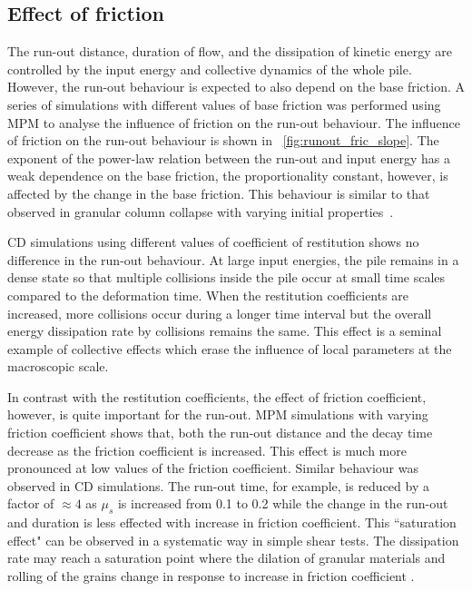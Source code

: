 \subsection{Effect of friction}
\label{sec:parameters}

The run-out distance, duration of flow, and the dissipation of kinetic energy 
are controlled by the input energy and collective dynamics of the whole pile. 
However, the run-out behaviour is expected to also depend on the base friction. 
A series of simulations with different values of base friction was performed 
using MPM to analyse the influence of friction on the run-out behaviour. The 
influence of friction on the run-out behaviour is shown in
~\cref{fig:runout_fric_slope}. The exponent of the 
power-law relation between the run-out and input energy has a weak dependence 
on the base friction, the proportionality constant, however, is affected by the 
change in the base friction. This behaviour is similar to that observed in 
granular column collapse with varying initial 
properties~\citep{Balmforth2005,Lajeunesse2005}. 

CD simulations using different values of coefficient of restitution shows no 
difference in the run-out behaviour. At large input energies, the pile remains 
in a dense state so that multiple collisions inside the pile occur at small 
time scales compared to the deformation time. When the restitution coefficients 
are increased, more collisions occur during a longer time interval but the 
overall energy dissipation rate by collisions remains the same. This effect is 
a seminal example of collective effects which erase the influence of local 
parameters at the macroscopic scale.

In contrast with the restitution coefficients, the effect of friction 
coefficient, however, is quite important for the run-out. MPM simulations with 
varying friction coefficient shows that, both the run-out distance and the 
decay time decrease as the friction coefficient is increased. This 
effect is much more pronounced at low values of the friction coefficient. 
Similar behaviour was observed in CD simulations. The run-out time, for 
example, is reduced by a factor of $\approx 4$ as $\mu_s$ is increased from 0.1 
to 0.2 while the change in the run-out and duration is less effected with 
increase in friction coefficient. This ``saturation effect" 
can be observed in a systematic way in simple shear tests. The dissipation rate 
may reach a saturation point where the dilation of granular materials and 
rolling of the grains change in response to increase in friction coefficient 
\cite{Estrada2008}.

